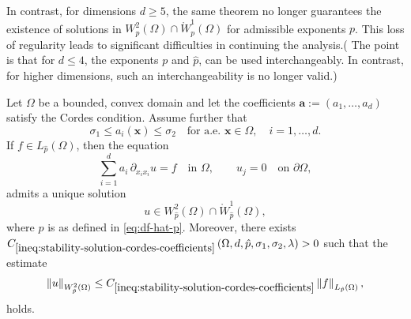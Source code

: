 \documentclass[final,onefignum,onetabnum]{mousaviart}
\begin{document}
	In contrast, for dimensions \( d \geq 5 \), the same theorem no longer guarantees the existence of solutions in \( W^{2}_{p}(\Omega) \cap \mathring{W}^{1}_{p}(\Omega) \) for admissible exponents \( p \). This loss of regularity leads to significant difficulties in continuing the analysis.({\color{red} The point is that for $d\leq 4$, the exponents $p$ and $\hat p$, can be used interchangeably. In contrast, for higher dimensions, such an interchangeability is no longer valid.})
	\begin{theorem}
		\label{lem:well-posedness-linear-equation-cordes-coefficients}
		Let $\Omega$ be a bounded, convex domain and let the coefficients $\boldsymbol{a} := (a_1, \dots, a_d)$ satisfy the Cordes condition. Assume further that 
		\[
		\sigma_1 \le a_i(\boldsymbol{x}) \le \sigma_2
		\quad \text{for a.e.\ } \boldsymbol{x} \in \Omega,\quad i = 1,\dots,d.
		\]
		If $f \in L_{\hat p}(\Omega)$,
		then the equation
		\begin{equation}
			\label{eq:-linear-system-cordes-coefficients}
			\sum_{i=1}^{d}
			a_i\, \partial_{x_i x_i} u
			=
			f
			\quad \text{in } \Omega,
			\qquad
			u_j = 0
			\quad \text{on } \partial\Omega,		
		\end{equation}
		admits a unique solution 
		\[
		u \in W^{2}_{\hat{p}}(\Omega) \cap \mathring{W}^{1}_{\hat{p}}(\Omega),
		\]
		{\color{red} 
			where $\hat{p}$ is as defined in \eqref{eq:df-hat-p}.}
		Moreover, there exists $C_{\ref{ineq:stability-solution-cordes-coefficients}}
		\left( \Omega, d, \hat{p}, \sigma_1, \sigma_2, \lambda \right) >0 $ such that  the estimate
		\begin{equation}
			\label{ineq:stability-solution-cordes-coefficients}
			\left\| u \right\|_{W^{2}_{\hat{p}}(\Omega)}
			\le
			C_{\ref{ineq:stability-solution-cordes-coefficients}}	
			\left\| f \right\|_{L_{\hat{p}}(\Omega)},
		\end{equation}
		holds.
	\end{theorem}
\end{document}
